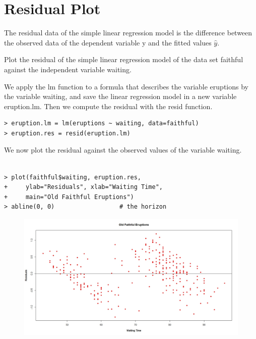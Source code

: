 \documentclass[residuals.tex]{subfiles}
\begin{document}
\section{Residual Plot}

The residual data of the simple linear regression model is the difference between the observed data of the dependent variable y and the fitted values $\hat{y}$.
 

 
Plot the residual of the simple linear regression model of the data set faithful against the independent variable waiting.
 


 
We apply the lm function to a formula that describes the variable eruptions by the variable waiting, and save the linear regression model in a new variable eruption.lm. Then we compute the residual with the resid function.
 
\begin{framed}
\begin{verbatim}
> eruption.lm = lm(eruptions ~ waiting, data=faithful) 
> eruption.res = resid(eruption.lm) 
\end{verbatim}
\end{framed}

We now plot the residual against the observed values of the variable waiting. 
\begin{framed}
	\begin{verbatim}

> plot(faithful$waiting, eruption.res, 
+     ylab="Residuals", xlab="Waiting Time", 
+     main="Old Faithful Eruptions") 
> abline(0, 0)                  # the horizon 
\end{verbatim}
\end{framed}

\begin{figure}[h!]
\centering
\includegraphics[width=0.99\linewidth]{oldfaithfulresiduals}
\caption{}
\label{fig:oldfaithfulresiduals}
\end{figure}

\end{document}

